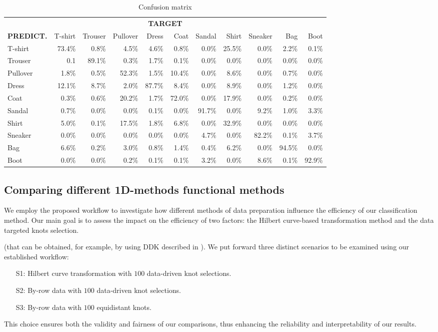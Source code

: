 \begin{enumerate}[leftmargin=0.2cm]
\begin{table}[h]
\centering
\caption{Confusion matrix}
\small
 \begin{tabular}{l r r r r r r r r r r}
 \toprule 
 \multicolumn{11}{c}{\bf TARGET}\\
 \bf PREDICT. &T-shirt & Trouser & Pullover & Dress & Coat & Sandal & Shirt & Sneaker &Bag &Boot\\
 \midrule
T-shirt& 73.4\% &0.8\% &4.5\% &4.6\% &0.8\% &0.0\% & 25.5\% &0.0\% &2.2\% & 0.1\%\\
Trouser& 0.1 & 89.1\% &0.3\% &1.7\% &0.1\% &0.0\% &0.0\% &0.0\% &0.0\% & 0.0\%\\
Pullover& 1.8\% &0.5\% & 52.3\% &1.5\% & 10.4\% &0.0\% &8.6\% &0.0\% &0.7\% & 0.0\%\\
Dress & 12.1\% &8.7\% &2.0\% & 87.7\% &8.4\% &0.0\% &8.9\% &0.0\% &1.2\% & 0.0\% \\
Coat & 0.3\% &0.6\% & 20.2\% &1.7\% & 72.0\% &0.0\% & 17.9\% &0.0\% &0.2\% & 0.0\%\\
Sandal & 0.7\% &0.0\% &0.0\% &0.1\% &0.0\% & 91.7\% &0.0\% &9.2\% &1.0\% & 3.3\%\\
Shirt & 5.0\% &0.1\% & 17.5\% &1.8\% &6.8\% &0.0\% & 32.9\% &0.0\% &0.0\% & 0.0\%\\
Sneaker & 0.0\% &0.0\% &0.0\% &0.0\% &0.0\% &4.7\% &0.0\% & 82.2\% &0.1\% & 3.7\% \\
Bag & 6.6\% &0.2\% &3.0\% &0.8\% &1.4\% &0.4\% &6.2\% &0.0\% & 94.5\% & 0.0\% \\
Boot & 0.0\% &0.0\% &0.2\% &0.1\% &0.1\% &3.2\% &0.0\% &8.6\% &0.1\% &92.9\%\\
\bottomrule
\end{tabular}
\label{tab:confusion}
\end{table}
\end{enumerate}

\vspace{-.13cm}
\subsection{Comparing different 1D-methods functional methods}\vspace{-.22cm}
We employ the proposed workflow to investigate how different methods of data preparation influence the efficiency of our classification method.
Our main goal is to assess the impact on the efficiency of two factors: the Hilbert curve-based transformation method and the data targeted knots selection.

 (that can be obtained, for example, by using DDK described in  \cite{basna2022data}). 
We put forward three distinct scenarios to be examined using our established workflow:
\begin{itemize}
    \item [S1:] Hilbert curve transformation with $100$ data-driven knot selections.
    \item [S2:] By-row data with $100$ data-driven knot selections.
    \item [S3:] By-row data with $100$ equidistant knots.
\end{itemize}
This choice ensures both the validity and fairness of our comparisons, thus enhancing the reliability and interpretability of our results. 

